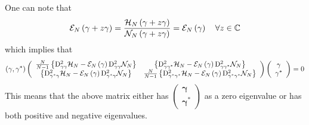 \documentclass[aps,preprint]{revtex4}
\begin{document}
One can note that 
\begin{equation}
\mathcal{E}_{N}\left( \mathbf{\gamma }+z\mathbf{\gamma }\right) =\frac{%
\mathcal{H}_{N}\left( \mathbf{\gamma }+z\mathbf{\gamma }\right) }{\mathcal{N}%
_{N}\left( \mathbf{\gamma }+z\mathbf{\gamma }\right) }=\mathcal{E}_{N}\left( 
\mathbf{\gamma }\right) \quad \forall z\in \mathbb{C}
\end{equation}%
which implies that 
\begin{equation}
\left( \mathbf{\gamma ,\gamma }^{\ast }\right) \left( 
\begin{array}{cc}
\frac{N}{N-1}\left\{ \mathrm{D}_{\gamma \gamma }^{2}\mathcal{H}_{N}-\mathcal{%
E}_{N}\left( \mathbf{\gamma }\right) \mathrm{D}_{\gamma \gamma }^{2}\mathcal{%
N}_{N}\right\} & \left\{ \mathrm{D}_{\gamma \gamma ^{\ast }}^{2}\mathcal{H}%
_{N}-\mathcal{E}_{N}\left( \mathbf{\gamma }\right) \mathrm{D}_{\gamma \gamma
^{\ast }}^{2}\mathcal{N}_{N}\right\} \\ 
\left\{ \mathrm{D}_{\gamma ^{\ast }\gamma }^{2}\mathcal{H}_{N}-\mathcal{E}%
_{N}\left( \mathbf{\gamma }\right) \mathrm{D}_{\gamma ^{\ast }\gamma }^{2}%
\mathcal{N}_{N}\right\} & \frac{N}{N-1}\left\{ \mathrm{D}_{\gamma ^{\ast
}\gamma ^{\ast }}^{2}\mathcal{H}_{N}-\mathcal{E}_{N}\left( \mathbf{\gamma }%
\right) \mathrm{D}_{\gamma ^{\ast }\gamma ^{\ast }}^{2}\mathcal{N}%
_{N}\right\}%
\end{array}%
\right) \left( 
\begin{array}{c}
\mathbf{\gamma } \\ 
\mathbf{\gamma }^{\ast }%
\end{array}%
\right) =0
\end{equation}%
This means that the above matrix either has $\left( 
\begin{array}{c}
\mathbf{\gamma } \\ 
\mathbf{\gamma }^{\ast }%
\end{array}%
\right) $ as a zero eigenvalue or has both positive and negative eigenvalues.
\end{document}
